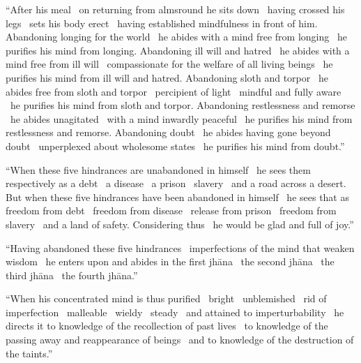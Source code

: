\begin{justify}
“After his meal \breathmark\ on returning from almsround he sits down \breathmark\ having crossed his legs \breathmark\ sets his body erect \breathmark\ having established mindfulness in front of him. Abandoning longing
for the world \breathmark\ he abides with a mind free from longing \breathmark\ he purifies his mind from longing. Abandoning ill will and hatred \breathmark\ he abides with a mind free from ill will \breathmark\ compassionate for the welfare of all living beings \breathmark\ he purifies his mind from ill will and hatred. Abandoning sloth and torpor \breathmark\ he abides free from sloth and torpor \breathmark\ percipient of light \breathmark\ mindful and fully aware \breathmark\ he purifies his mind from sloth and torpor. Abandoning restlessness and remorse \breathmark\ he abides unagitated \breathmark\ with a mind inwardly peaceful \breathmark\ he purifies his mind from restlessness and remorse. Abandoning doubt \breathmark\ he abides having gone beyond doubt \breathmark\ unperplexed about wholesome states \breathmark\ he purifies his mind from doubt.”
\end{justify}

\suttaRef{[MN 107]}

\begin{justify}
“When these five hindrances are unabandoned in himself \breathmark\ he sees them respectively as a debt \breathmark\ a disease \breathmark\ a prison \breathmark\ slavery \breathmark\ and a road across a desert. But when these five hindrances have been abandoned in himself \breathmark\ he sees that as freedom from debt \breathmark\ freedom from disease \breathmark\ release from prison \breathmark\ freedom from slavery \breathmark\ and a land of safety. Considering thus \breathmark\ he would be glad and full of joy.”
\end{justify}

\begin{justify}
“Having abandoned these five hindrances \breathmark\ imperfections of the mind that weaken wisdom \breathmark\ he enters upon and abides in the first jhāna \breathmark\ the second jhāna \breathmark\ the third jhāna \breathmark\ the fourth jhāna.”
\end{justify}

\begin{justify}
“When his concentrated mind is thus purified \breathmark\ bright \breathmark\ unblemished \breathmark\ rid of imperfection \breathmark\ malleable \breathmark\ wieldy \breathmark\ steady \breathmark\ and attained to imperturbability \breathmark\ he directs it to knowledge of the recollection of past lives \breathmark\ to knowledge of the passing away and reappearance of beings \breathmark\ and to knowledge of the destruction of the taints.”
\end{justify}

